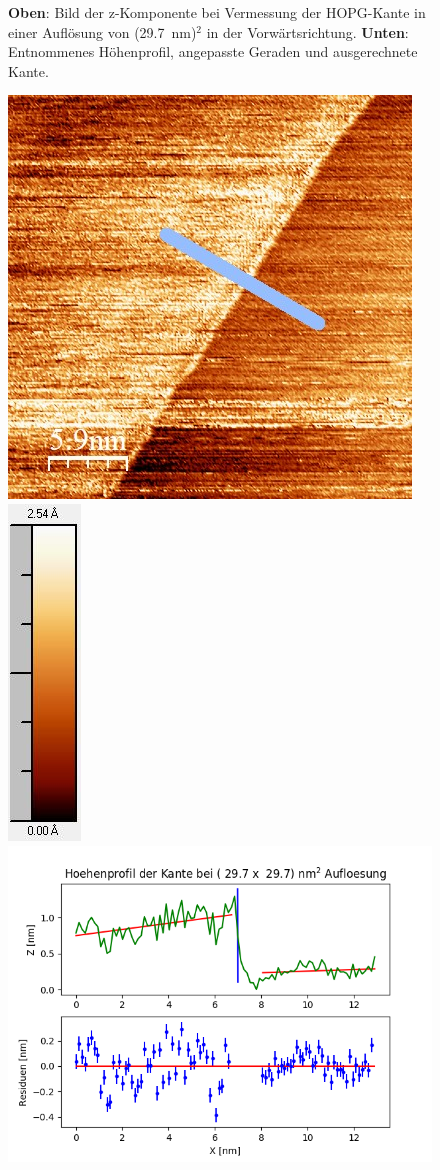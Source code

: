 \documentclass[12pt,a4paper]{article}
\begin{document}
\begin{figure}
\caption{\textbf{Oben}: Bild der z-Komponente bei Vermessung der HOPG-Kante in einer Auflösung von (\SI{29,7}{nm})$^2$ in der Vorwärtsrichtung. \textbf{Unten}: Entnommenes Höhenprofil, angepasste Geraden und ausgerechnete Kante.}
\end{figure}

\begin{figure}
\centering
\includegraphics[scale=0.6]{Bilder/Anhang/Kante/0297_Kante_nach.jpg}
\includegraphics[scale=0.6]{Bilder/Anhang/Kante/0297_Kante_nach_Skala.jpg}
\includegraphics[scale=0.6]{Bilder/Anhang/Kante/Profil_Kante_0297_rueck.png}

\end{figure}
\end{document}
